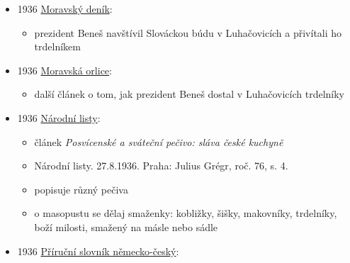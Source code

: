 \begin{itemize}
  \begin{itemize}
  \tightlist
  \item
  \item
    vyšlo posmrtně, k vydání sestavil její manžel Emanuel
  \item
    s. 58:

    \begin{itemize}
    \tightlist
    \item
      recept na kremrole z kynutého těsta
    \item
      těsto z másla, cukru, žloutků, mlíka, mouky
    \item
      před pečením se potírají žloutky a sypou mandlema
    \item
      plněný meruňkovým krémem, což je následující recept z marmelády a
      bílků
    \end{itemize}
  \end{itemize}
\item
  1936
  \href{https://ceskadigitalniknihovna.cz/view/uuid:21c28337-816c-4103-a6ae-143ab29b452a?page=uuid\%3A138254c0-7d8d-11e9-b171-5ef3fc9ae867&fulltext=trdeln\%C3\%ADk\%20OR\%20trdeln\%C3\%ADky\%20OR\%20trdeln\%C3\%ADk\%C5\%AF&source=nkp}{Moravský
  deník}:

  \begin{itemize}
  \tightlist
  \item
    prezident Beneš navštívil Slováckou búdu v Luhačovicích a přivítali
    ho trdelníkem
  \end{itemize}
\item
  1936
  \href{https://ceskadigitalniknihovna.cz/view/uuid:5e938270-0675-11df-93e5-000d606f5dc6?page=uuid:37544fe0-fb63-11de-ba13-000d606f5dc6&fulltext=trdeln\%C3\%AD*&source=mzk}{Moravská
  orlice}:

  \begin{itemize}
  \tightlist
  \item
    další článek o tom, jak prezident Beneš dostal v Luhačovicích
    trdelníky
  \end{itemize}
\item
  1936
  \href{https://ceskadigitalniknihovna.cz/uuid/uuid:f2e890b0-435d-11dd-b505-00145e5790ea}{Národní
  listy}:

  \begin{itemize}
  \tightlist
  \item
    článek \emph{Posvícenské a sváteční pečivo: sláva české kuchyně}
  \item
    Národní listy. 27.8.1936. Praha: Julius Grégr, roč. 76, s. 4.
  \item
    popisuje různý pečiva
  \item
    o masopustu se dělaj smaženky: kobližky, šišky, makovníky,
    trdelníky, boží milosti, smažený na másle nebo sádle
  \end{itemize}
\item
  1936
  \href{https://ceskadigitalniknihovna.cz/view/uuid:d4dd6060-bfc4-11e3-aec3-005056827e52?page=uuid\%3A23cc3e33-7f1f-49cd-8c09-67351d084c07&fulltext=trdeln*&source=nkp}{Příruční
  slovník německo-český}:


\end{itemize}
